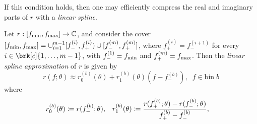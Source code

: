 If this condition holds, then one may efficiently compress the real and imaginary parts of $r$ with a \textit{linear spline}.
\begin{definition}[]\label{}
Let $r:[f_{\text{min}},f_{\text{max}}] \to \mathbb{C}$, and consider the cover $[f_{\text{min}}, f_{\text{max}}] = \cup_{i=1}^{m-1}[f_-^{(i)}, f_+^{(i)}) \cup [f_-^{(m)}, f^{(m)}_+]$, where $f_+^{(i)}=f_-^{(i+1)}$ for every $i \in \brk[c]{1, \ldots, m-1}$, with $f_-^{(1)}=f_{\text{min}}$ and $ f_+^{(m)}=f_{\text{max}}$. Then the \textit{linear spline approximation} of $r$ is given by
\begin{equation}\label{}
r(f; \theta) \approx r_0^{(b)}(\theta) + r_1^{(b)}(\theta)(f-f_-^{(b)}), \; \; f \in \text{bin} \; b
\end{equation}
where
\begin{align*}
r_0^{(b)}(\theta) &\coloneqq r(f_-^{(b)};\theta) , &
r_1^{(b)}(\theta) &\coloneqq \frac{r(f_+^{(b)};\theta) - r(f_-^{(b)}; \theta)}{f_+^{(b)} - f_-^{(b)}}, &
\end{align*}
\end{definition}




